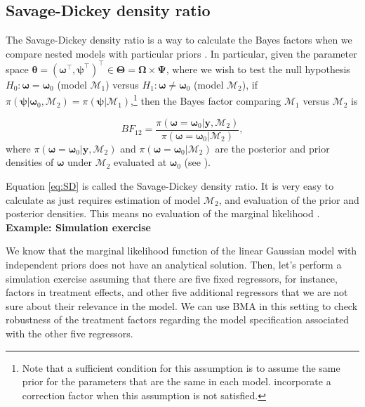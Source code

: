 \subsection{Savage-Dickey density ratio}\label{sec10_11}

The Savage-Dickey density ratio is a way to calculate the Bayes factors when we compare nested models with particular priors \cite{dickey1971weighted,verdinelli1995computing}. In particular, given the parameter space $\bm{\theta}=(\bm{\omega}^{\top}, \bm{\psi}^{\top})^{\top}\in \bm{\Theta}=\bm{\Omega}\times \bm{\Psi}$, where we wish to test the null hypothesis $H_0:\bm{\omega}=\bm{\omega}_0$ (model $\mathcal{M}_1$) versus $H_1:\bm{\omega}\neq \bm{\omega}_0$ (model $\mathcal{M}_2$), if $\pi(\bm{\psi}|\bm{\omega}_0,\mathcal{M}_2)=\pi(\bm{\psi}|\mathcal{M}_1)$,\footnote{Note that a sufficient condition for this assumption is to assume the same prior for the parameters that are the same in each model. \cite{verdinelli1995computing} incorporate a correction factor when this assumption is not satisfied.} then the Bayes factor comparing $\mathcal{M}_1$ versus $\mathcal{M}_2$ is

\begin{equation}\label{eq:SD}
	BF_{12}=\frac{\pi(\bm{\omega}=\bm{\omega}_0|\bm{y},\mathcal{M}_2)}{\pi(\bm{\omega}=\bm{\omega}_0|\mathcal{M}_2)},
\end{equation}
where $\pi(\bm{\omega}=\bm{\omega}_0|\bm{y},\mathcal{M}_2)$ and $\pi(\bm{\omega}=\bm{\omega}_0|\mathcal{M}_2)$ are the posterior and prior densities of $\bm{\omega}$ under $\mathcal{M}_2$ evaluated at $\bm{\omega}_0$ (see \cite{verdinelli1995computing}). 

Equation \ref{eq:SD} is called the Savage-Dickey density ratio. It is very easy to calculate as just requires estimation of model $\mathcal{M}_2$, and evaluation of the prior and posterior densities. This means no evaluation of the marginal likelihood \cite[Chap.~4]{koop2003bayesian}.\\

\textbf{Example: Simulation exercise}

We know that the marginal likelihood function of the linear Gaussian model with independent priors does not have an analytical solution. Then, let's perform a simulation exercise assuming that there are five fixed regressors, for instance, factors in treatment effects, and other five additional regressors that we are not sure about their relevance in the model. We can use BMA in this setting to check robustness of the treatment factors regarding the model specification associated with the other five regressors.

